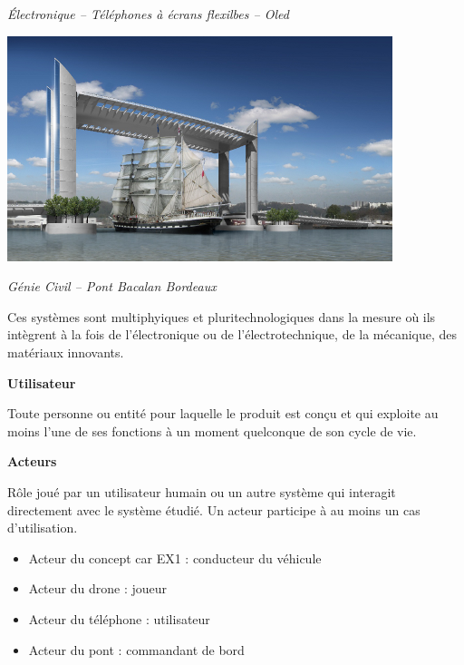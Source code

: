 \documentclass[11pt,oneside]{article}
\begin{document}
\begin{exemple}
\begin{minipage}[c]{.22\linewidth}
\begin{center}
\textit{Électronique -- Téléphones à écrans flexilbes -- \textit{Oled} \cite{oled}}
\end{center}
\end{minipage}\hfill
\begin{minipage}[c]{.22\linewidth}
\begin{center}
\includegraphics[width=\textwidth]{png/pont_bacalan_p}

\textit{Génie Civil -- Pont Bacalan Bordeaux\cite{pont}}
\end{center}
\end{minipage}

Ces systèmes sont multiphyiques et pluritechnologiques dans la mesure où ils intègrent à la fois de l'électronique ou de l'électrotechnique, de la mécanique, des matériaux innovants. 

\end{exemple}


\begin{defi}

\textbf{Utilisateur} \cite{norme}

Toute personne ou entité pour laquelle le produit est conçu et qui exploite au moins l'une de ses fonctions à un moment quelconque de son cycle de vie.


\textbf{Acteurs}\cite{roques}

Rôle joué par un utilisateur humain ou un autre système qui interagit directement avec le système étudié. Un acteur participe à au moins un cas d'utilisation.

\end{defi}

\begin{exemple}
\begin{itemize}
\item Acteur du concept car EX1 : conducteur du véhicule
\item Acteur du drone : joueur
\item Acteur du téléphone : utilisateur 
\item Acteur du pont : commandant de bord
\end{itemize}
\end{exemple}
\end{document}
